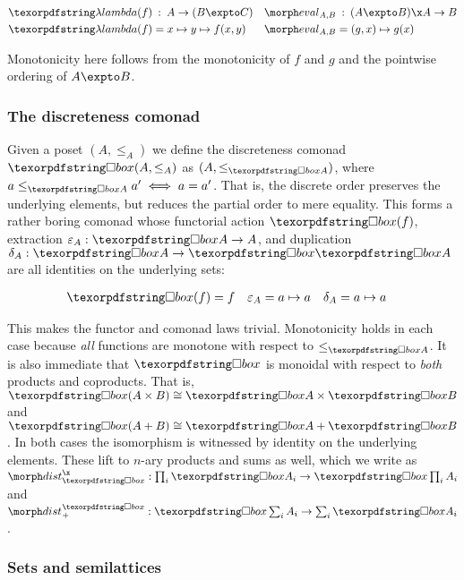 \begin{align*}
  \fn(f) &\isa A \to (B \expto C) &
  \eval_{A,B} &\isa (A \expto B) \x A \to B
  \\
  \fn(f) &= x \mapsto y \mapsto f(x,y) &
  \eval_{A,B} &= (g,x) \mapsto g(x)
\end{align*}

\noindent
Monotonicity here follows from the monotonicity of $f$ and $g$ and the pointwise
ordering of $A \expto B$.


\subsubsection{The discreteness comonad}

Given a poset $(A, \le_A)$ we define the discreteness comonad $\iso(A, \le_A)$
as $(A, \le_{\iso A})$, where \( a \le_{\iso A} a' \iff a = a' \).
%
That is, the discrete order preserves the underlying elements, but reduces the
partial order to mere equality.
%
This forms a rather boring comonad whose functorial action $\iso(f)$, extraction $\varepsilon_A : \iso A \to A$, and duplication $\delta_A : \iso A \to \iso \iso A$ are all identities on the underlying sets:

\nopagebreak[2]
\begin{align*}
  \iso(f) &= f & \varepsilon_A &= a \mapsto a & \delta_A &= a \mapsto a
\end{align*}

\noindent
This makes the functor and comonad laws trivial. Monotonicity holds in each case because \emph{all} functions are monotone with respect to $\le_{\iso A}$.
%
It is also immediate that $\iso$ is monoidal with respect to \emph{both}
products and coproducts. That is, $\iso (A \times B) \cong \iso A \times \iso B$
and $\iso (A + B) \cong \iso A + \iso B$.
%
In both cases the isomorphism is witnessed by identity on the underlying
elements.
%
These lift to $n$-ary products and sums as well, which we write as $\isox : \prod_i \iso A_i \to \iso\prod_i A_i$ and $\isosum : \iso \sum_i
A_i \to \sum_i \iso A_i$.


\subsubsection{Sets and semilattices}

